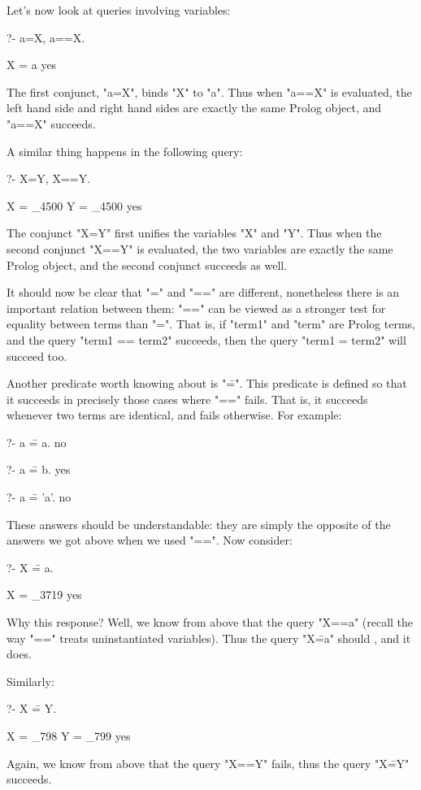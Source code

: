 Let's now look at queries involving  variables:
\begin{LPNcodedisplay}
?- a=X, a==X.

X = a
yes
\end{LPNcodedisplay}
The first conjunct, "a=X", binds "X" to "a".  Thus when
"a==X" is evaluated, the left hand side and right hand sides are
exactly the same Prolog object, and "a==X" succeeds.

A similar thing happens in the following query:
\begin{LPNcodedisplay}
?- X=Y, X==Y.

X = _4500
Y = _4500
yes
\end{LPNcodedisplay}
The conjunct "X=Y" first unifies the variables "X" and "Y".  Thus when
the second conjunct "X==Y" is evaluated, the two variables are exactly
the same Prolog object, and the second conjunct succeeds as well.

It should now be clear that "=" and "==" are different, nonetheless
there is an important relation between them: "==" can be viewed as a
stronger test for equality between terms than "=".  That is, if
"term1" and "term" are Prolog terms, and the query "term1 == term2"
succeeds, then the query "term1 = term2" will succeed too.

Another predicate worth knowing about is "\==".  This predicate is
defined so that it succeeds in precisely those cases where "==" fails.
That is, it succeeds whenever two terms are  identical, and fails otherwise.  For example:
\begin{LPNcodedisplay}
?- a \== a.
no

?- a \== b.
yes

?- a \== 'a'.
no
\end{LPNcodedisplay}
These answers should be understandable: they are simply the opposite of the
answers we got above when we used "==". Now consider:
\begin{LPNcodedisplay}
?- X \== a.

X = _3719
yes
\end{LPNcodedisplay}
Why this response?  Well, we know from above that the query "X==a"
 (recall the way "==" treats uninstantiated variables).
Thus the query "X\==a" should , and it does.

Similarly:
\begin{LPNcodedisplay}
?- X \== Y.

X = _798
Y = _799
yes
\end{LPNcodedisplay}
Again, we know from above that the query "X==Y" fails, thus the query
"X\==Y" succeeds.

